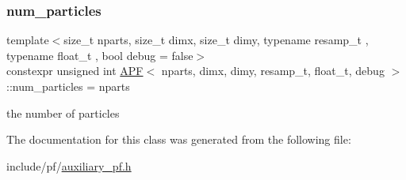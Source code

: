 \subsubsection{\texorpdfstring{num\+\_\+particles}{num\_particles}}
{\footnotesize\ttfamily template$<$size\+\_\+t nparts, size\+\_\+t dimx, size\+\_\+t dimy, typename resamp\+\_\+t , typename float\+\_\+t , bool debug = false$>$ \\
constexpr unsigned int \hyperlink{classAPF}{A\+PF}$<$ nparts, dimx, dimy, resamp\+\_\+t, float\+\_\+t, debug $>$\+::num\+\_\+particles = nparts\hspace{0.3cm}{\ttfamily [static]}}

the number of particles 

The documentation for this class was generated from the following file\+:\begin{DoxyCompactItemize}
\item 
include/pf/\hyperlink{auxiliary__pf_8h}{auxiliary\+\_\+pf.\+h}\end{DoxyCompactItemize}
